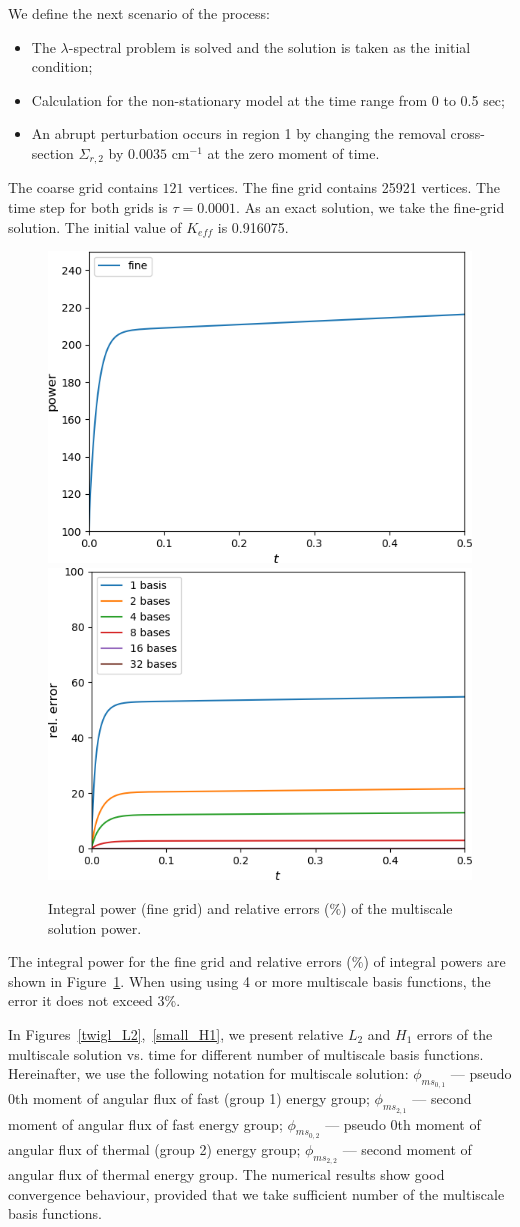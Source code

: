 \documentclass[preprint]{elsarticle}
\begin{document}
We define the next scenario of the process:
\begin{itemize}
	\item The $\lambda$-spectral problem is solved and the solution is taken as the initial condition;
	\item Calculation for the non-stationary model at the time range from 0 to 0.5 sec;
	\item An abrupt perturbation occurs in region 1 by changing the removal cross-section $\Sigma_{r,2}$ by $0.0035$ cm$^{-1}$ at the zero moment of time.
\end{itemize}

The coarse grid contains $121$ vertices.
The fine grid contains 25921 vertices. 
The time step for both grids is $\tau = 0.0001$.
As an exact solution, we take the fine-grid solution.
The initial value of $K_{eff}$ is 0.916075. 

\begin{figure}[ht]
	\centering
		\includegraphics[width=0.45\linewidth]{twigl/power_fine.png} \hspace{2em}
		\includegraphics[width=0.45\linewidth]{twigl/power_error.png}
	\caption{Integral power (fine grid) and relative errors ($\%$) of the multiscale solution power.}
	\label{twigl_power}
\end{figure}

The integral power for the fine grid and relative errors ($\%$) of integral powers are shown in Figure~\ref{twigl_power}.
When using using 4 or more multiscale basis functions, the error it does not exceed 3\%.

In Figures~\ref{twigl_L2},~\ref{small_H1}, we present relative $L_2$ and $H_1$ errors of the multiscale solution vs. time for different number of multiscale basis functions. Hereinafter, we use the following notation for multiscale solution: $\phi_{ms_{0, 1}}$ --- pseudo 0th moment of angular flux of fast (group 1) energy group;  $\phi_{ms_{2, 1}}$ --- second moment of angular flux of fast energy group; $\phi_{ms_{0, 2}}$ --- pseudo 0th moment of angular flux of thermal (group 2) energy group;  $\phi_{ms_{2, 2}}$ --- second moment of angular flux of thermal energy group.
The numerical results show good convergence behaviour, provided that we take sufficient number of the multiscale basis functions.
\end{document}
